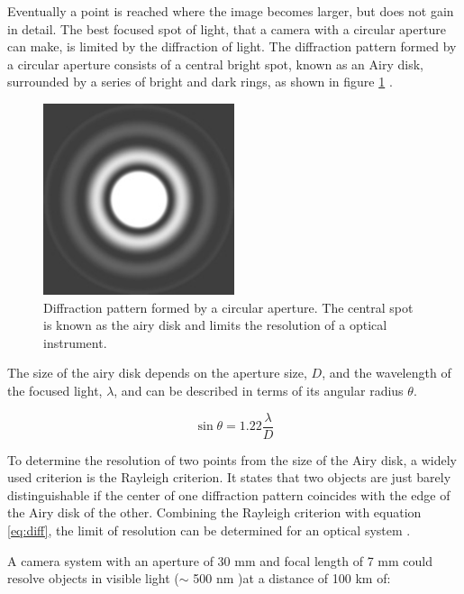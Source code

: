 Eventually a point is reached where the image becomes larger, but does not gain in detail. The best focused spot of light, that a camera with a circular aperture can make, is limited by the diffraction of light. The diffraction pattern formed by a circular aperture consists of a central bright spot, known as an Airy disk, surrounded by a series of bright and dark rings, as shown in figure \ref{airy} \cite{uniphys}.

\begin{figure}[H]
\begin{center}
\includegraphics[width=0.5\textwidth]{figures/airy.eps}
\caption{Diffraction pattern formed by a circular aperture. The central spot is known as the airy disk and limits the resolution of a optical instrument.}
\label{airy}
\end{center}
\end{figure}

The size of the airy disk depends on the aperture size, $D$, and the wavelength of the focused light, $\lambda$, and can be described in terms of its angular radius $\theta$.

\begin{equation}
\label{eq:diff}
\sin \theta = 1.22 \dfrac{\lambda}{D}
\end{equation}

To determine the resolution of two points from the size of the Airy disk, a widely used criterion is the Rayleigh criterion. It states that two objects are just barely distinguishable if the center of one diffraction pattern coincides with the edge of the Airy disk of the other. Combining the Rayleigh criterion with equation \ref{eq:diff}, the limit of resolution can be determined for an optical system \cite{uniphys}.

A camera system with an aperture of 30 mm and focal length of 7 mm could resolve objects in visible light ($\sim$ 500 nm )at a distance of 100  km of: 

